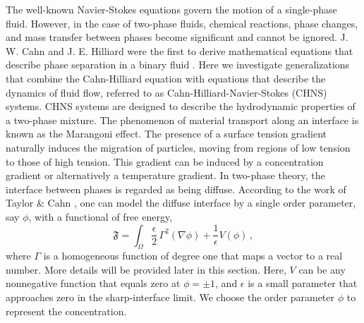 \documentclass[11pt]{article}
\begin{document}
The well-known Navier-Stokes equations govern the motion of a single-phase fluid. However, in the case of two-phase fluids, chemical reactions, phase changes, and mass transfer between phases become significant and cannot be ignored. J. W. Cahn and J. E. Hilliard were the first to derive mathematical equations that describe phase separation in a binary fluid \cite{cahn1958free}. Here we investigate generalizations that combine the Cahn-Hilliard equation with equations that describe the dynamics of fluid flow, referred to as Cahn-Hilliard-Navier-Stokes (CHNS) systems. CHNS systems are designed to describe the hydrodynamic properties of a two-phase mixture.
The phenomenon of material transport along an interface is known as the Marangoni effect. The presence of a surface tension gradient naturally induces the migration of particles, moving from regions of low tension to those of high tension. This gradient can be induced by a concentration gradient or alternatively a temperature gradient. In two-phase theory, the interface between phases is regarded as being diffuse. According to the work of Taylor \& Cahn \cite{taylor-cahn98}, one can model the diffuse interface by a single order parameter, say $\phi$, with a functional of free energy,  
\[
\mathfrak{F}= \int_{\Omega} \frac{\epsilon}{2}\, \Gamma^2(\nabla \phi) + \frac{1}{\epsilon} V(\phi)\,,
\]
where $\Gamma$ is a homogeneous function of degree one that maps a vector to a real number. More details will be provided later in this section. Here, $V$ can be any nonnegative function that equals zero at $\phi = \pm1$, and $\epsilon$ is a small parameter that approaches zero in the sharp-interface limit. We choose the order parameter $\phi$ to represent the concentration.
\end{document}
